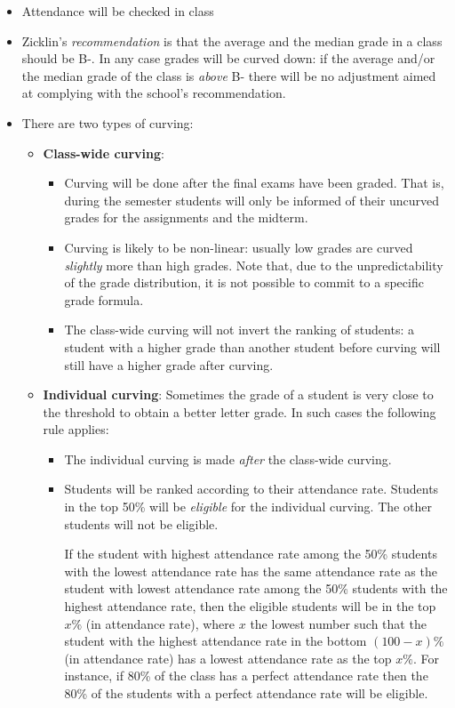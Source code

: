 \documentclass[12]{article}
\begin{document}
\begin{itemize}
\item Attendance will be checked in class
\item Zicklin's \textit{recommendation} is that the average and the
  median grade in a class should be B-. In any case grades will be
  curved down:  if the average and/or the median grade of the
  class is \textit{above} B- there will be no adjustment aimed at
  complying with the school's recommendation. 
\item There are two types of curving: 
    
    \begin{itemize}

    \item \textbf{Class-wide curving}:
        \begin{itemize}
        \item Curving will be done after the final exams have been
        graded. That is, during the semester students will only be informed of their uncurved grades for the assignments and the midterm. 
        \item Curving is likely to be non-linear: usually  low
  grades are curved \textit{slightly} more than high grades. Note
  that, due to
  the unpredictability of the grade distribution, it is not possible to
  commit to a specific grade formula. 
        \item The class-wide curving will
  not invert the ranking of students: a student with a higher grade
  than another student  before curving will still have a higher grade
  after curving. 
        \end{itemize}
    
    \item \textbf{Individual curving}: Sometimes the grade of a student is very close to the threshold to obtain a better letter grade. In such cases the following rule applies:
    
        \begin{itemize}
        \item The individual curving is made \textit{after} the class-wide curving. 
        \item Students will be ranked according to their attendance rate. Students in the top  50\% will be \textit{eligible} for the individual curving. The other students will not be eligible.
        \medskip 

If the student with highest attendance rate among the 50\% students
with the lowest attendance rate  has the same  attendance rate as the student 
with lowest attendance rate among the 50\% students with the highest
attendance rate, then the eligible students will be in the top $x\%$
(in attendance rate), where $x$ the lowest number  such that
the student with the highest attendance rate in the bottom $(100-x)\%$
(in attendance rate) has a lowest attendance rate as the top
$x\%$. For instance, if 80\% of the class has a perfect 
attendance rate then the  80\% of the students with a perfect
attendance rate will be eligible.


\end{itemize}
\end{itemize}
\end{itemize}
\end{document}
